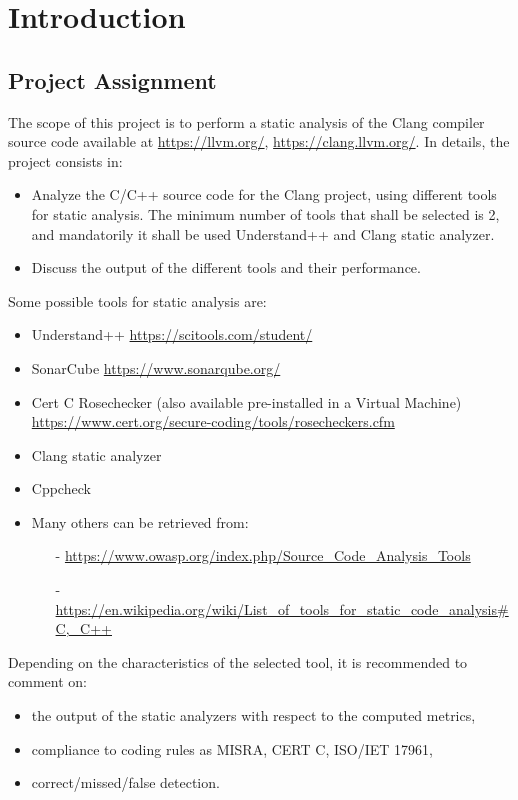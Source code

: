 \chapter{Introduction}

\section{Project Assignment}

The scope of this project is to perform a static analysis of the Clang compiler source code available at
\url{https://llvm.org/}, \url{https://clang.llvm.org/}.
In details, the project consists in:
\begin{itemize}
	\item Analyze the C/C++ source code for the Clang project, using different tools for static analysis. The
minimum number of tools that shall be selected is 2, and mandatorily it shall be used Understand++ and Clang static analyzer.
	\item Discuss the output of the different tools and their performance.
\end{itemize}
Some possible tools for static analysis are:
\begin{itemize}
	\item Understand++ \url{https://scitools.com/student/}
	\item SonarCube \url{https://www.sonarqube.org/}
	\item Cert C Rosechecker (also available pre-installed in a Virtual Machine) \url{https://www.cert.org/secure-coding/tools/rosecheckers.cfm}
	\item Clang static analyzer
	\item Cppcheck
	\item Many others can be retrieved from:
	\begin{itemize}		
	 	\item[ - ]\url{https://www.owasp.org/index.php/Source_Code_Analysis_Tools}
		\item[ - ]\url{https://en.wikipedia.org/wiki/List_of_tools_for_static_code_analysis\#C,_C++}
	\end{itemize}
\end{itemize}

Depending on the characteristics of the selected tool, it is recommended to comment on:
\begin{itemize}
	\item the output of the static analyzers with respect to the computed metrics,
	\item compliance to coding rules as MISRA, CERT C, ISO/IET 17961,
	\item correct/missed/false detection.
\end{itemize}

